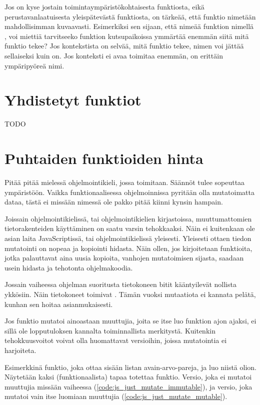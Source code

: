 Jos on kyse jostain toimintaympäristökohtaisesta funktiosta, eikä perustavanlaatuisesta yleispätevästä funktiosta, on tärkeää, että funktio nimetään mahdollisimman kuvaavasti. Esimerkiksi sen sijaan, että nimeää funktion nimellä \textcite{processUsers}, voi miettiä tarvitseeko funktion kutsupaikoissa ymmärtää enemmän siitä mitä funktio tekee? Jos kontekstista on selvää, mitä funktio tekee, nimen voi jättää sellaiseksi kuin on. Jos konteksti ei avaa toimitaa enemmän, \textcite{processUsers} on erittäin ympäripyöreä nimi.

\section{Yhdistetyt funktiot}

TODO

\section{Puhtaiden funktioiden hinta}

Pitää pitää mielessä ohjelmointikieli, jossa toimitaan. Säännöt tulee sopeuttaa ympäristöön. Vaikka funktionaalisessa ohjelmoinnissa pyritään olla mutatoimatta dataa, tästä ei missään nimessä ole pakko pitää kiinni kynsin hampain.

Joissain ohjelmointikielissä, tai ohjelmointikielien kirjastoissa, muuttumattomien tietorakenteiden käyttäminen on saatu varsin tehokkaaksi. Näin ei kuitenkaan ole asian laita JavaScriptissä, tai ohjelmointikielissä yleisesti. Yleisesti ottaen tiedon mutatointi on nopeaa ja kopiointi hidasta. Näin ollen, jos kirjoitetaan funktioita, jotka palauttavat aina uusia kopioita, vanhojen mutatoimisen sijasta, saadaan usein hidasta ja tehotonta ohjelmakoodia.

Jossain vaiheessa ohjelman suoritusta tietokoneen bitit kääntyilevät nollista ykkösiin. Näin tietokoneet toimivat \cite{is_reduce_bad}. Tämän vuoksi mutaatiota ei kannata pelätä, kunhan sen hoitaa asianmukaisesti.

Jos funktio mutatoi ainoastaan muuttujia, joita se itse luo funktion ajon ajaksi, ei sillä ole lopputuloksen kannalta toiminnallista merkitystä. Kuitenkin tehokkuusvoitot voivat olla huomattavat versioihin, joissa mutatointia ei harjoiteta.

Esimerkkinä funktio, joka ottaa sisään listan avain-arvo-pareja, ja luo niistä olion. Näytetään kaksi (funktionaalista) tapaa totettaa funktio.
Versio, joka ei mutatoi muuttujia missään vaiheessa (\ref{code:js_just_mutate_immutable}), ja versio, joka mutatoi vain itse luomiaan muuttujia (\ref{code:js_just_mutate_mutable}).

